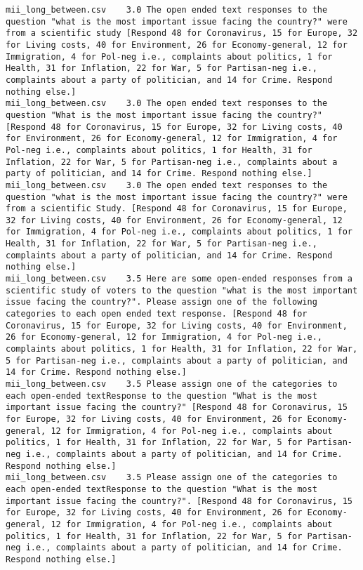 \begin{lstlisting}
mii_long_between.csv	3.0	The open ended text responses to the question "what is the most important issue facing the country?" were from a scientific study [Respond 48 for Coronavirus, 15 for Europe, 32 for Living costs, 40 for Environment, 26 for Economy-general, 12 for Immigration, 4 for Pol-neg i.e., complaints about politics, 1 for Health, 31 for Inflation, 22 for War, 5 for Partisan-neg i.e., complaints about a party of politician, and 14 for Crime. Respond nothing else.]
mii_long_between.csv	3.0	The open ended text responses to the question "What is the most important issue facing the country?" [Respond 48 for Coronavirus, 15 for Europe, 32 for Living costs, 40 for Environment, 26 for Economy-general, 12 for Immigration, 4 for Pol-neg i.e., complaints about politics, 1 for Health, 31 for Inflation, 22 for War, 5 for Partisan-neg i.e., complaints about a party of politician, and 14 for Crime. Respond nothing else.]
mii_long_between.csv	3.0	The open ended text responses to the question "what is the most important issue facing the country?" were from a scientific Study. [Respond 48 for Coronavirus, 15 for Europe, 32 for Living costs, 40 for Environment, 26 for Economy-general, 12 for Immigration, 4 for Pol-neg i.e., complaints about politics, 1 for Health, 31 for Inflation, 22 for War, 5 for Partisan-neg i.e., complaints about a party of politician, and 14 for Crime. Respond nothing else.]
mii_long_between.csv	3.5	Here are some open-ended responses from a scientific study of voters to the question "what is the most important issue facing the country?". Please assign one of the following categories to each open ended text response. [Respond 48 for Coronavirus, 15 for Europe, 32 for Living costs, 40 for Environment, 26 for Economy-general, 12 for Immigration, 4 for Pol-neg i.e., complaints about politics, 1 for Health, 31 for Inflation, 22 for War, 5 for Partisan-neg i.e., complaints about a party of politician, and 14 for Crime. Respond nothing else.]
mii_long_between.csv	3.5	Please assign one of the categories to each open-ended textResponse to the question "What is the most important issue facing the country?" [Respond 48 for Coronavirus, 15 for Europe, 32 for Living costs, 40 for Environment, 26 for Economy-general, 12 for Immigration, 4 for Pol-neg i.e., complaints about politics, 1 for Health, 31 for Inflation, 22 for War, 5 for Partisan-neg i.e., complaints about a party of politician, and 14 for Crime. Respond nothing else.]
mii_long_between.csv	3.5	Please assign one of the categories to each open-ended textResponse to the question "What is the most important issue facing the country?". [Respond 48 for Coronavirus, 15 for Europe, 32 for Living costs, 40 for Environment, 26 for Economy-general, 12 for Immigration, 4 for Pol-neg i.e., complaints about politics, 1 for Health, 31 for Inflation, 22 for War, 5 for Partisan-neg i.e., complaints about a party of politician, and 14 for Crime. Respond nothing else.]

\end{lstlisting}
